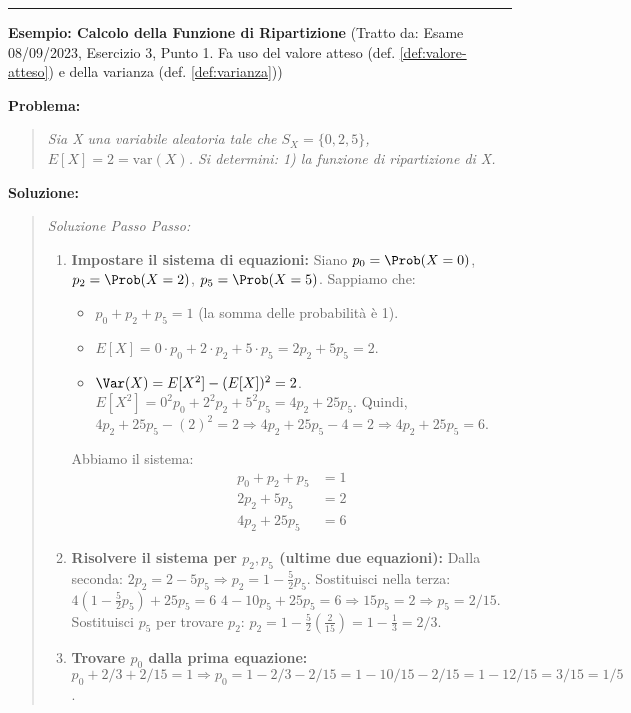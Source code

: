 \vspace{1em} 
\hrule
\par\vspace{0.5em}
\noindent\textbf{Esempio: Calcolo della Funzione di Ripartizione} (Tratto da: Esame 08/09/2023, Esercizio 3, Punto 1. Fa uso del valore atteso (def. \ref{def:valore-atteso}) e della varianza (def. \ref{def:varianza}))
\par\vspace{0.5em}
\noindent\textbf{Problema:}
\begin{quote}
\itshape
Sia X una variabile aleatoria tale che $S_X = \{0,2,5\}$, $E[X] = 2 = \text{var}(X)$. Si determini:
1) la funzione di ripartizione di X.
\end{quote}
\noindent\textbf{Soluzione:}
\begin{quote}
\textit{Soluzione Passo Passo:}
\begin{enumerate}
    \item \textbf{Impostare il sistema di equazioni:}
    Siano $p_0 = \Prob(X=0)$, $p_2 = \Prob(X=2)$, $p_5 = \Prob(X=5)$.
    Sappiamo che:
    \begin{itemize}
        \item $p_0 + p_2 + p_5 = 1$ (la somma delle probabilità è 1).
        \item $E[X] = 0 \cdot p_0 + 2 \cdot p_2 + 5 \cdot p_5 = 2p_2 + 5p_5 = 2$.
        \item $\Var(X) = E[X^2] - (E[X])^2 = 2$.
          $E[X^2] = 0^2 p_0 + 2^2 p_2 + 5^2 p_5 = 4p_2 + 25p_5$.
          Quindi, $4p_2 + 25p_5 - (2)^2 = 2 \Rightarrow 4p_2 + 25p_5 - 4 = 2 \Rightarrow 4p_2 + 25p_5 = 6$.
    \end{itemize}
    Abbiamo il sistema:
    \begin{align*}
        p_0 + p_2 + p_5 &= 1 \\
        2p_2 + 5p_5 &= 2 \\
        4p_2 + 25p_5 &= 6
    \end{align*}
    \item \textbf{Risolvere il sistema per $p_2, p_5$ (ultime due equazioni):}
    Dalla seconda: $2p_2 = 2 - 5p_5 \Rightarrow p_2 = 1 - \frac{5}{2}p_5$.
    Sostituisci nella terza: $4(1 - \frac{5}{2}p_5) + 25p_5 = 6$
    $4 - 10p_5 + 25p_5 = 6 \Rightarrow 15p_5 = 2 \Rightarrow p_5 = 2/15$.
    Sostituisci $p_5$ per trovare $p_2$: $p_2 = 1 - \frac{5}{2}(\frac{2}{15}) = 1 - \frac{1}{3} = 2/3$.
    \item \textbf{Trovare $p_0$ dalla prima equazione:}
    $p_0 + 2/3 + 2/15 = 1 \Rightarrow p_0 = 1 - 2/3 - 2/15 = 1 - 10/15 - 2/15 = 1 - 12/15 = 3/15 = 1/5$.

\end{enumerate}
\end{quote}
